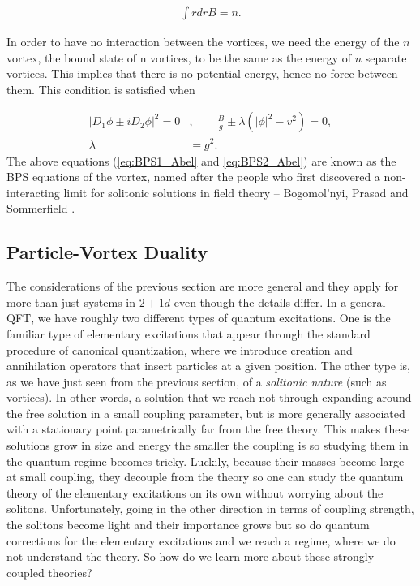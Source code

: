     \begin{align}
        \int r dr B = n.
    \end{align}

    In order to have no interaction between the vortices, we need the energy of the $n$ vortex, the bound state of n vortices, to be the same as the energy of $n$ separate vortices. This implies that there is no potential energy, hence no force between them. This condition is satisfied when

    \begin{align}
        |D_1\phi \pm i D_2 \phi|^2 =0&,  \qquad \frac{B}{g} \pm \lambda \left(|\phi|^2 -v^2  \right) =0, \label{eq:BPS1_Abel}\\
        \lambda &= g^2 .\label{eq:BPS2_Abel}
    \end{align}
    The above equations (\eqref{eq:BPS1_Abel} and \eqref{eq:BPS2_Abel}) are known as the BPS equations of the vortex, named after the people who first discovered a non-interacting limit for solitonic solutions in field theory -- Bogomol'nyi, Prasad and Sommerfield \cite{Bogomolny:1975de} \cite{Prasad1975}.
    

    \subsection{Particle-Vortex Duality}
    The considerations of the previous section are more general and they apply for more than just systems in $2+1d$ even though the details differ. In a general QFT, we have roughly two different types of quantum excitations. One is the familiar type of elementary excitations that appear through the standard procedure of canonical quantization, where we introduce creation and annihilation operators that insert particles at a given position. The other type is, as we have just seen from the previous section, of a \textit{solitonic nature} (such as vortices). In other words, a solution that we reach not through expanding around the free solution in a small coupling parameter, but is more generally associated with a stationary point parametrically far from the free theory. This makes these solutions grow in size and energy the smaller the coupling is so studying them in the quantum regime becomes tricky. Luckily, because their masses become large at small coupling, they decouple from the theory so one can study the quantum theory of the elementary excitations on its own without worrying about the solitons. Unfortunately, going in the other direction in terms of coupling strength, the solitons become light and their importance grows but so do quantum corrections for the elementary excitations and we reach a regime, where we do not understand the theory. So how do we learn more about these strongly coupled theories?

